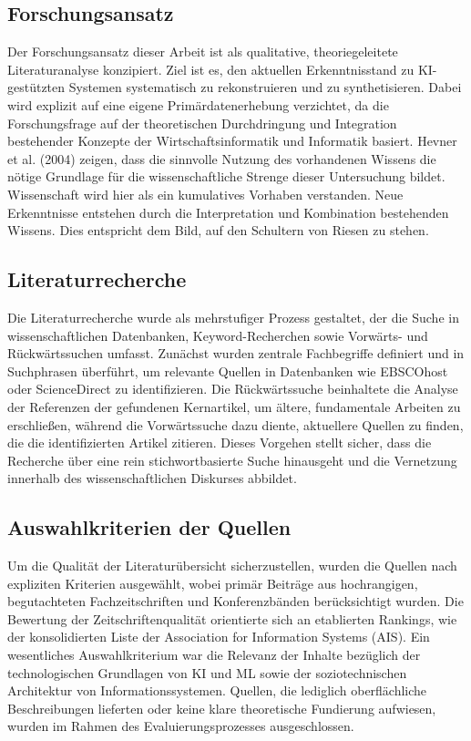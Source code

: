 \subsection{Forschungsansatz}

Der Forschungsansatz dieser Arbeit ist als qualitative, theoriegeleitete Literaturanalyse konzipiert. Ziel ist es, den aktuellen Erkenntnisstand zu \ac{KI}-gestützten Systemen systematisch zu rekonstruieren und zu synthetisieren. Dabei wird explizit auf eine eigene Primärdatenerhebung verzichtet, da die Forschungsfrage auf der theoretischen Durchdringung und Integration bestehender Konzepte der Wirtschaftsinformatik und Informatik basiert. Hevner et al. (2004) zeigen, dass die sinnvolle Nutzung des vorhandenen Wissens die nötige Grundlage für die wissenschaftliche Strenge dieser Untersuchung bildet. Wissenschaft wird hier als ein kumulatives Vorhaben verstanden. Neue Erkenntnisse entstehen durch die Interpretation und Kombination bestehenden Wissens. Dies entspricht dem Bild, auf den Schultern von Riesen zu stehen.

\subsection{Literaturrecherche}

Die Literaturrecherche wurde als mehrstufiger Prozess gestaltet, der die Suche in wissenschaftlichen Datenbanken, Keyword-Recherchen sowie Vorwärts- und Rückwärtssuchen umfasst. Zunächst wurden zentrale Fachbegriffe definiert und in Suchphrasen überführt, um relevante Quellen in Datenbanken wie EBSCOhost oder ScienceDirect zu identifizieren. Die Rückwärtssuche beinhaltete die Analyse der Referenzen der gefundenen Kernartikel, um ältere, fundamentale Arbeiten zu erschließen, während die Vorwärtssuche dazu diente, aktuellere Quellen zu finden, die die identifizierten Artikel zitieren. Dieses Vorgehen stellt sicher, dass die Recherche über eine rein stichwortbasierte Suche hinausgeht und die Vernetzung innerhalb des wissenschaftlichen Diskurses abbildet.

\subsection{Auswahlkriterien der Quellen}

Um die Qualität der Literaturübersicht sicherzustellen, wurden die Quellen nach expliziten Kriterien ausgewählt, wobei primär Beiträge aus hochrangigen, begutachteten Fachzeitschriften und Konferenzbänden berücksichtigt wurden. Die Bewertung der Zeitschriftenqualität orientierte sich an etablierten Rankings, wie der konsolidierten Liste der Association for Information Systems (\ac{AIS}). Ein wesentliches Auswahlkriterium war die Relevanz der Inhalte bezüglich der technologischen Grundlagen von \ac{KI} und \ac{ML} sowie der soziotechnischen Architektur von Informationssystemen. Quellen, die lediglich oberflächliche Beschreibungen lieferten oder keine klare theoretische Fundierung aufwiesen, wurden im Rahmen des Evaluierungsprozesses ausgeschlossen.

